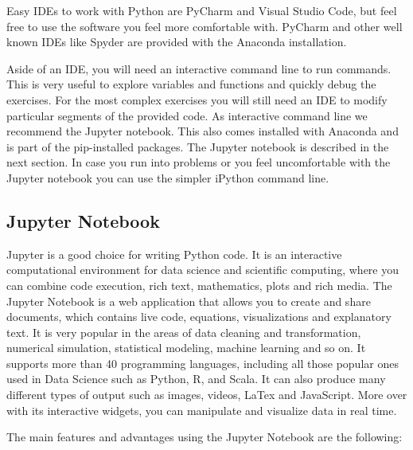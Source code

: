 Easy IDEs to work with Python are PyCharm and Visual Studio Code, but feel free to use the software you feel more comfortable with. PyCharm and other well known IDEs like Spyder are provided with the Anaconda installation.

Aside of an IDE, you will need an interactive command line to run commands. This is very useful to explore variables and functions and quickly debug the exercises. For the most complex exercises you will still need an IDE to modify particular segments of the provided code. As interactive command line we recommend the Jupyter notebook. This also comes installed with Anaconda and is part of the pip-installed packages. The Jupyter notebook is described in the next section. In case you run into problems or you feel uncomfortable with the Jupyter notebook you can use the simpler iPython command line.

\subsection{Jupyter Notebook}

Jupyter is a good choice for writing Python code. It is an interactive computational environment for data science and scientific computing, where you can combine code execution, rich text, mathematics, plots and rich media. The Jupyter Notebook is a web application that allows you to create and share documents, which contains live code, equations, visualizations and explanatory text. It is very popular in the areas of data cleaning and transformation, numerical simulation, statistical modeling, machine learning and so on. It supports more than 40 programming languages, including all those popular ones used in Data Science such as Python, R, and Scala. It can also produce many different types of output such as images, videos, LaTex and JavaScript. More over with its interactive widgets, you can manipulate and visualize data in real time.

\noindent The main features and advantages using the Jupyter Notebook are the
following:

